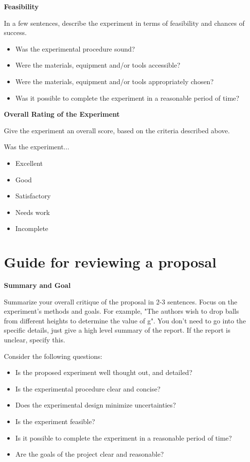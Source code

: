 \textbf{Feasibility}

In a few sentences, describe the experiment in terms of feasibility and chances of success. 

\begin{itemize}
\item Was the experimental procedure sound?
\item Were the materials, equipment and/or tools accessible? 
\item Were the materials, equipment and/or tools appropriately chosen?
\item Was it possible to complete the experiment in a reasonable period of time?
\end{itemize}


\textbf{Overall Rating of the Experiment}

Give the experiment an overall score, based on the criteria described above.

Was the experiment...
\begin{itemize}
\item Excellent
\item Good
\item Satisfactory
\item Needs work
\item Incomplete
\end{itemize}

\newpage
\section{Guide for reviewing a proposal}
 \vspace{0.25cm}
\textbf{Summary and Goal}

Summarize your overall critique of the proposal in 2-3 sentences. Focus on the experiment's methods and goals. For example, "The authors wish to drop balls from different heights to determine the value of g". You don't need to go into the specific details, just give a high level summary of the report. If the report is unclear, specify this.

Consider the following questions:
\begin{itemize}
\item Is the proposed experiment well thought out, and detailed?
\item Is the experimental procedure clear and concise?
\item Does the experimental design minimize uncertainties?
\item Is the experiment feasible? 
\item Is it possible to complete the experiment in a reasonable period of time?
\item Are the goals of the project clear and reasonable?
\end{itemize}

